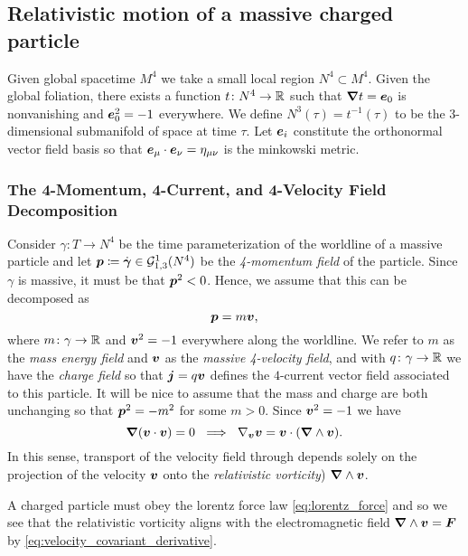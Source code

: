 \documentclass[conf]{new-aiaa}
\begin{document}
\subsection{Relativistic motion of a massive charged particle}

Given global spacetime $M^4$ we take a small local region $N^4\subset M^4$. Given the global foliation, there exists a function $t \colon N^4 \to \mathbb{R}$ such that $\boldsymbol{\nabla} t = \boldsymbol{e}_0$ is nonvanishing and $\boldsymbol{e}_0^2=-1$ everywhere. We define $N^3(\tau)=t^{-1}(\tau)$ to be the 3-dimensional submanifold of space at time $\tau$. Let $\boldsymbol{e}_i$ constitute the orthonormal vector field basis so that $\boldsymbol{e}_\mu \cdot \boldsymbol{e}_\nu = \eta_{\mu \nu}$ is the minkowski metric. 

\subsubsection{The 4-Momentum, 4-Current, and 4-Velocity Field Decomposition}

Consider $\gamma \colon T \to N^4$ be the time parameterization of the worldline of a massive particle and let $\boldsymbol{p} \coloneqq \dot{\boldsymbol{\gamma}} \in \mathcal{G}_{1,3}^1(N^4)$ be the \emph{4-momentum field} of the particle. Since $\gamma$ is massive, it must be that $\boldsymbol{p}^2<0$. Hence, we assume that this can be decomposed as
\begin{equation}
    \boldsymbol{p} = m \boldsymbol{v},
\end{equation}
where $m\colon \gamma \to \mathbb{R}$ and $\boldsymbol{v}^2=-1$ everywhere along the worldline. We refer to $m$ as the \emph{mass energy field} and $\boldsymbol{v}$ as the \emph{massive 4-velocity field}, and with $q\colon \gamma \to \mathbb{R}$ we have the \emph{charge field} so that $\boldsymbol{j}=q\boldsymbol{v}$ defines the $4$-current vector field associated to this particle. It will be nice to assume that the mass and charge are both unchanging so that $\boldsymbol{p}^2=-m^2$ for some $m>0$. Since $\boldsymbol{v}^2=-1$ we have
\begin{equation}
\label{eq:velocity_covariant_derivative}
    \boldsymbol{\nabla} ({\boldsymbol{v}} \cdot {\boldsymbol{v}}) = 0 ~\implies~ \nabla_{\boldsymbol{v}} {\boldsymbol{v}} =  {\boldsymbol{v}}\cdot (\boldsymbol{\nabla} \wedge {\boldsymbol{v}}).
\end{equation}
In this sense, transport of the velocity field through depends solely on the projection of the velocity ${\boldsymbol{v}}$ onto the \emph{relativistic vorticity}) $\boldsymbol{\nabla} \wedge {\boldsymbol{v}}$.

A charged particle must obey the lorentz force law \cref{eq:lorentz_force} and so we see that the relativistic vorticity aligns with the electromagnetic field $\boldsymbol{\nabla} \wedge \boldsymbol{v} = \boldsymbol{F}$ by \cref{eq:velocity_covariant_derivative}.
\end{document}
